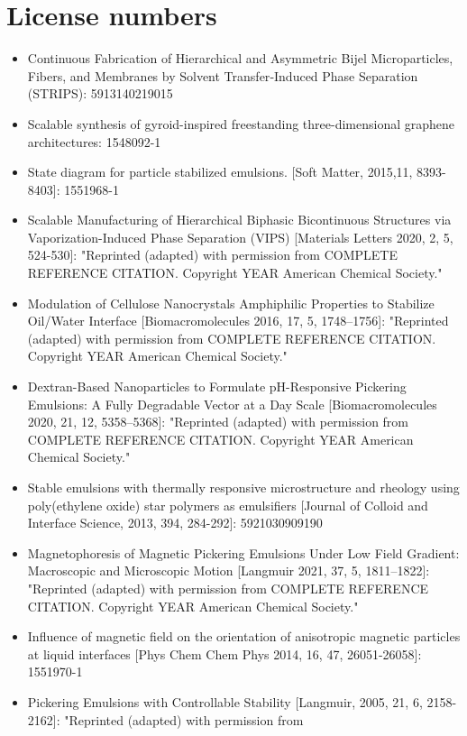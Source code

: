\section{License numbers}

\begin{itemize}
    \item Continuous Fabrication of Hierarchical and Asymmetric Bijel Microparticles, 
    Fibers, and Membranes by Solvent Transfer‐Induced Phase Separation (STRIPS): 5913140219015
    \item Scalable synthesis of gyroid-inspired freestanding three-dimensional graphene architectures: 1548092-1
    \item State diagram for particle stabilized emulsions. [Soft Matter, 2015,11, 8393-8403]: 1551968-1
    \item Scalable Manufacturing of Hierarchical Biphasic Bicontinuous Structures via Vaporization-Induced 
    Phase Separation (VIPS) [Materials Letters 2020, 2, 5, 524-530]: "Reprinted (adapted) with permission from 
    {COMPLETE REFERENCE CITATION}. Copyright {YEAR} American Chemical Society."
    \item Modulation of Cellulose Nanocrystals Amphiphilic Properties to Stabilize Oil/Water Interface 
    [Biomacromolecules 2016, 17, 5, 1748–1756]: "Reprinted (adapted) with permission from 
    {COMPLETE REFERENCE CITATION}. Copyright {YEAR} American Chemical Society."
    \item Dextran-Based Nanoparticles to Formulate pH-Responsive Pickering Emulsions: A Fully Degradable 
    Vector at a Day Scale [Biomacromolecules 2020, 21, 12, 5358–5368]: "Reprinted (adapted) with permission from 
    {COMPLETE REFERENCE CITATION}. Copyright {YEAR} American Chemical Society."
    \item Stable emulsions with thermally responsive microstructure and rheology using poly(ethylene oxide) star 
    polymers as emulsifiers [Journal of Colloid and Interface Science, 2013, 394, 284-292]: 5921030909190
    \item Magnetophoresis of Magnetic Pickering Emulsions Under Low Field Gradient: Macroscopic and Microscopic 
    Motion [Langmuir 2021, 37, 5, 1811–1822]: "Reprinted (adapted) with permission from 
    {COMPLETE REFERENCE CITATION}. Copyright {YEAR} American Chemical Society."
    \item Influence of magnetic field on the orientation of anisotropic magnetic particles at liquid interfaces 
    [Phys Chem Chem Phys 2014, 16, 47, 26051-26058]: 1551970-1
    \item Pickering Emulsions with Controllable Stability [Langmuir, 2005, 21, 6, 2158-2162]: "Reprinted (adapted) with permission from 

\end{itemize}
